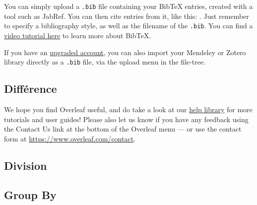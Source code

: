\documentclass{article}
\begin{document}
You can simply upload a \verb|.bib| file containing your BibTeX entries, created with a tool such as JabRef. You can then cite entries from it, like this: \cite{greenwade93}. Just remember to specify a bibliography style, as well as the filename of the \verb|.bib|. You can find a \href{https://www.overleaf.com/help/97-how-to-include-a-bibliography-using-bibtex}{video tutorial here} to learn more about BibTeX.

If you have an \href{https://www.overleaf.com/user/subscription/plans}{upgraded account}, you can also import your Mendeley or Zotero library directly as a \verb|.bib| file, via the upload menu in the file-tree.

\subsection{Différence}

We hope you find Overleaf useful, and do take a look at our \href{https://www.overleaf.com/learn}{help library} for more tutorials and user guides! Please also let us know if you have any feedback using the Contact Us link at the bottom of the Overleaf menu --- or use the contact form at \url{https://www.overleaf.com/contact}.

\subsection{Division}

\subsection{Group By}



\end{document}

